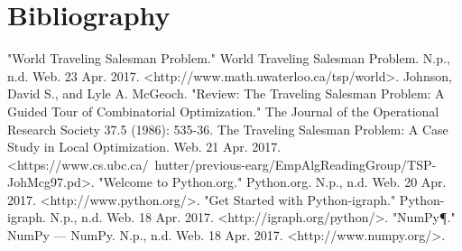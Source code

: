 \documentclass[a4paper,11pt]{scrartcl}
\begin{document}
\section{Bibliography}

"World Traveling Salesman Problem." World Traveling Salesman Problem. N.p., n.d. Web. 23 Apr. 2017. <http://www.math.uwaterloo.ca/tsp/world>.\newline
\newline
Johnson, David S., and Lyle A. McGeoch. "Review: The Traveling Salesman Problem: A Guided Tour of Combinatorial Optimization." The Journal of the Operational Research Society 37.5 (1986): 535-36. The Traveling Salesman Problem: A Case Study in Local Optimization. Web. 21 Apr. 2017. <https://www.cs.ubc.ca/~hutter/previous-earg/EmpAlgReadingGroup/TSP-JohMcg97.pd>.\newline
\newline
"Welcome to Python.org." Python.org. N.p., n.d. Web. 20 Apr. 2017. <http://www.python.org/>.\newline
\newline
"Get Started with Python-igraph." Python-igraph. N.p., n.d. Web. 18 Apr. 2017. <http://igraph.org/python/>.\newline
\newline
"NumPy¶." NumPy — NumPy. N.p., n.d. Web. 18 Apr. 2017. <http://www.numpy.org/>.\newline
\end{document}
